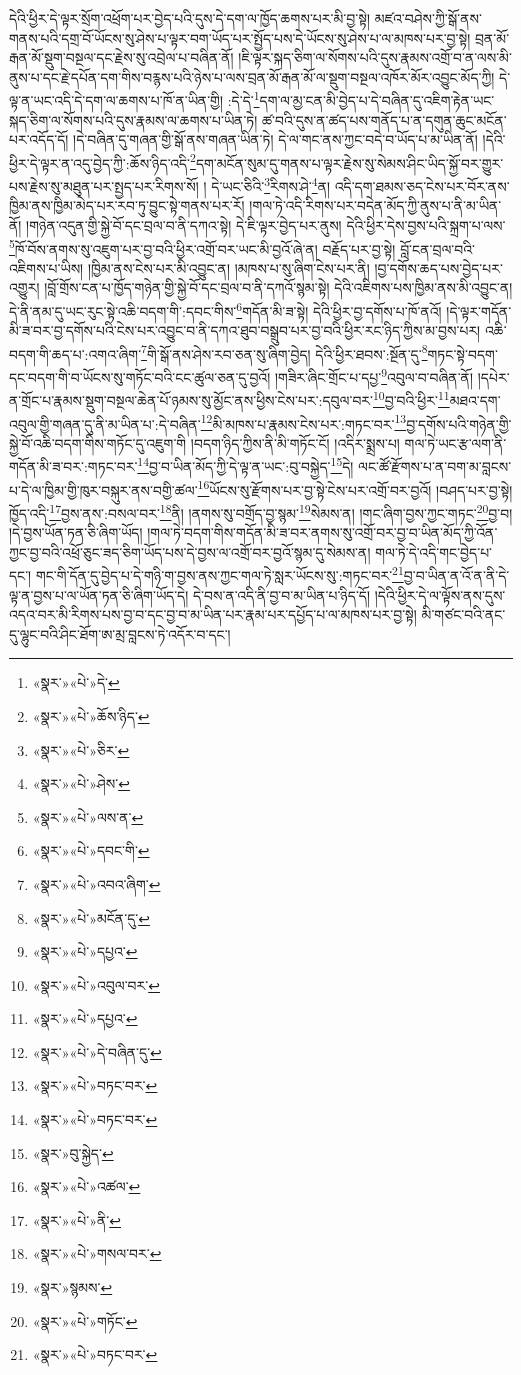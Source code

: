 དེའི་ཕྱིར་དེ་ལྟར་སྲོག་འཕྲོག་པར་བྱེད་པའི་དུས་དེ་དག་ལ་ཁྱོད་ཆགས་པར་མི་བྱ་སྟེ། མཛའ་བཤེས་ཀྱི་སྒོ་ནས་གནས་པའི་དགྲ་བོ་ཡོངས་སུ་ཤེས་པ་ལྟར་བག་ཡོད་པར་སྤྱོད་པས་དེ་ཡོངས་སུ་ཤེས་པ་ལ་མཁས་པར་བྱ་སྟེ། བྲན་མོ་རྒན་མོ་སྡུག་བསྔལ་དང་རྗེས་སུ་འབྲེལ་པ་བཞིན་ནོ། །ཇི་ལྟར་སྐད་ཅིག་ལ་སོགས་པའི་དུས་རྣམས་འགྲོ་བ་ན་ལས་མི་ནུས་པ་དང་རྗེ་དཔོན་དག་གིས་བརྙས་པའི་ཉེས་པ་ལས་བྲན་མོ་རྒན་མོ་ལ་སྡུག་བསྔལ་འཁོར་མོར་འབྱུང་མོད་ཀྱི། དེ་ལྟ་ན་ཡང་འདི་དེ་དག་ལ་ཆགས་པ་ཁོ་ན་ཡིན་གྱི། :དེ་དེ་\footnote{«སྣར་»«པེ་»དེ་}དག་ལ་མྱ་ངན་མི་བྱེད་པ་དེ་བཞིན་དུ་འཇིག་རྟེན་ཡང་སྐད་ཅིག་ལ་སོགས་པའི་དུས་རྣམས་ལ་ཆགས་པ་ཡིན་ཏེ། ཚ་བའི་དུས་ན་ཚད་པས་གནོད་པ་ན་དགུན་ཆུང་མངོན་པར་འདོད་དོ། །དེ་བཞིན་དུ་གཞན་གྱི་སྒོ་ནས་གཞན་ཡིན་ཏེ། དེ་ལ་གང་ནས་ཀྱང་བདེ་བ་ཡོད་པ་མ་ཡིན་ནོ། །དེའི་ཕྱིར་དེ་ལྟར་ན་འདུ་བྱེད་ཀྱི་:ཆོས་ཉིད་འདི་\footnote{«སྣར་»«པེ་»ཆོས་ཉིད་}དག་མངོན་སུམ་དུ་གནས་པ་ལྟར་རྗེས་སུ་སེམས་ཤིང་ཡིད་སྐྱོ་བར་གྱུར་པས་རྗེས་སུ་མཐུན་པར་སྤྱད་པར་རིགས་སོ། །
དེ་ཡང་ཅིའི་\footnote{«སྣར་»«པེ་»ཅིར་}རིགས་ཤེ་\footnote{«སྣར་»«པེ་»ཤེས་}ན། འདི་དག་ཐམས་ཅད་ངེས་པར་བོར་ནས་ཁྱིམ་ནས་ཁྱིམ་མེད་པར་རབ་ཏུ་བྱུང་སྟེ་གནས་པར་རོ། །གལ་ཏེ་འདི་རིགས་པར་བདེན་མོད་ཀྱི་ནུས་པ་ནི་མ་ཡིན་ནོ། །གཉེན་འདུན་གྱི་སྐྱེ་བོ་དང་བྲལ་བ་ནི་དཀའ་སྟེ། དེ་ཇི་ལྟར་བྱེད་པར་ནུས། དེའི་ཕྱིར་དེས་བྱས་པའི་སྐྲག་པ་ལས་\footnote{«སྣར་»«པེ་»ལས་ན་}ཁོ་བོས་ནགས་སུ་འཇུག་པར་བྱ་བའི་ཕྱིར་འགྲོ་བར་ཡང་མི་བྱའོ་ཞེ་ན། བརྗོད་པར་བྱ་སྟེ། བློ་ངན་བྲལ་བའི་འཇིགས་པ་ཡིས། །ཁྱིམ་ནས་ངེས་པར་མི་འབྱུང་ན། །མཁས་པ་སུ་ཞིག་ངེས་པར་ནི། །བྱ་དགོས་ཆད་པས་བྱེད་པར་འགྱུར། །བློ་གྲོས་ངན་པ་ཁྱོད་གཉེན་གྱི་སྐྱེ་བོ་དང་བྲལ་བ་ནི་དཀའོ་སྙམ་སྟེ། དེའི་འཇིགས་པས་ཁྱིམ་ནས་མི་འབྱུང་ན། དེ་ནི་ནམ་དུ་ཡང་རུང་སྟེ་འཆི་བདག་གི་:དབང་གིས་\footnote{«སྣར་»«པེ་»དབང་གི་}གདོན་མི་ཟ་སྟེ། དེའི་ཕྱིར་བྱ་དགོས་པ་ཁོ་ནའོ། །དེ་ལྟར་གདོན་མི་ཟ་བར་བྱ་དགོས་པའི་ངེས་པར་འབྱུང་བ་ནི་དཀའ་ཐུབ་བསྒྲུབ་པར་བྱ་བའི་ཕྱིར་རང་ཉིད་ཀྱིས་མ་བྱས་པར། འཆི་བདག་གི་ཆད་པ་:འགའ་ཞིག་\footnote{«སྣར་»«པེ་»འབའ་ཞིག་}གི་སྒོ་ནས་ཤེས་རབ་ཅན་སུ་ཞིག་བྱེད། དེའི་ཕྱིར་ཐབས་:སྔོན་དུ་\footnote{«སྣར་»«པེ་»མངོན་དུ་}གཏང་སྟེ་བདག་དང་བདག་གི་བ་ཡོངས་སུ་གཏོང་བའི་ངང་ཚུལ་ཅན་དུ་བྱའོ། །གཟིར་ཞིང་གྲོང་པ་དཔྱ་\footnote{«སྣར་»«པེ་»དཔྱའ་}འབུལ་བ་བཞིན་ནོ། །དཔེར་ན་གྲོང་པ་རྣམས་སྡུག་བསྔལ་ཆེན་པོ་ཉམས་སུ་མྱོང་ནས་ཕྱིས་ངེས་པར་:དབུལ་བར་\footnote{«སྣར་»«པེ་»འབུལ་བར་}བྱ་བའི་ཕྱིར་\footnote{«སྣར་»«པེ་»དཔྱའ་}མཐའ་དག་འབུལ་གྱི་གཞན་དུ་ནི་མ་ཡིན་པ་:དེ་བཞིན་\footnote{«སྣར་»«པེ་»དེ་བཞིན་དུ་}མི་མཁས་པ་རྣམས་ངེས་པར་:གཏང་བར་\footnote{«སྣར་»«པེ་»བཏང་བར་}བྱ་དགོས་པའི་གཉེན་གྱི་སྐྱེ་བོ་འཆི་བདག་གིས་གཏོང་དུ་འཇུག་གི །བདག་ཉིད་ཀྱིས་ནི་མི་གཏོང་ངོ། །འདིར་སྨྲས་པ། གལ་ཏེ་ཡང་རྩ་ལག་ནི་གདོན་མི་ཟ་བར་:གཏང་བར་\footnote{«སྣར་»«པེ་»བཏང་བར་}བྱ་བ་ཡིན་མོད་ཀྱི་དེ་ལྟ་ན་ཡང་:བུ་བསྐྱེད་\footnote{«སྣར་»བུ་སྐྱེད་}དེ། ལང་ཚོ་རྫོགས་པ་ན་བག་མ་བླངས་པ་དེ་ལ་ཁྱིམ་གྱི་ཁུར་བསྐུར་ནས་བགྱི་ཚལ་\footnote{«སྣར་»«པེ་»འཚལ་}ཡོངས་སུ་རྫོགས་པར་བྱ་སྟེ་ངེས་པར་འགྲོ་བར་བྱའོ། །བཤད་པར་བྱ་སྟེ། ཁྱོད་འདི་\footnote{«སྣར་»«པེ་»ནི་}བྱས་ནས་:བསལ་བར་\footnote{«སྣར་»«པེ་»གསལ་བར་}ནི། །ནགས་སུ་བགྲོད་བྱ་སྙམ་\footnote{«སྣར་»སྙམས་}སེམས་ན། །གང་ཞིག་བྱས་ཀྱང་གཏང་\footnote{«སྣར་»«པེ་»གཏོང་}བྱ་བ། །དེ་བྱས་ཡོན་ཏན་ཅི་ཞིག་ཡོད། །གལ་ཏེ་བདག་གིས་གདོན་མི་ཟ་བར་ནགས་སུ་འགྲོ་བར་བྱ་བ་ཡིན་མོད་ཀྱི་འོན་ཀྱང་བྱ་བའི་འཕྲོ་ཅུང་ཟད་ཅིག་ཡོད་པས་དེ་བྱས་ལ་འགྲོ་བར་བྱའོ་སྙམ་དུ་སེམས་ན། གལ་ཏེ་དེ་འདི་གང་བྱེད་པ་དང་། གང་གི་དོན་དུ་བྱེད་པ་དེ་གཉི་ག་བྱས་ནས་ཀྱང་གལ་ཏེ་སླར་ཡོངས་སུ་:གཏང་བར་\footnote{«སྣར་»«པེ་»བཏང་བར་}བྱ་བ་ཡིན་ན་འོ་ན་ནི་དེ་ལྟ་ན་བྱས་པ་ལ་ཡོན་ཏན་ཅི་ཞིག་ཡོད་དེ། དེ་བས་ན་འདི་ནི་བྱ་བ་མ་ཡིན་པ་ཉིད་དོ། །དེའི་ཕྱིར་དེ་ལ་ལྟོས་ནས་དུས་འདའ་བར་མི་རིགས་པས་བྱ་བ་དང་བྱ་བ་མ་ཡིན་པར་རྣམ་པར་དཔྱོད་པ་ལ་མཁས་པར་བྱ་སྟེ། མི་གཙང་བའི་ནང་དུ་ལྷུང་བའི་ཤིང་ཐོག་ཨ་མྲ་བླངས་ཏེ་འདོར་བ་དང་། 